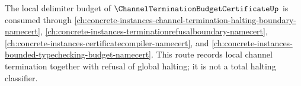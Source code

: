 The local delimiter budget of $\ChannelTerminationBudgetCertificateUp$ is consumed through \autoref{ch:concrete-instances-channel-termination-halting-boundary-namecert}, \autoref{ch:concrete-instances-terminationrefusalboundary-namecert}, \autoref{ch:concrete-instances-certificatecompiler-namecert}, and \autoref{ch:concrete-instances-bounded-typechecking-budget-namecert}. This route records local channel termination together with refusal of global halting; it is not a total halting classifier.
